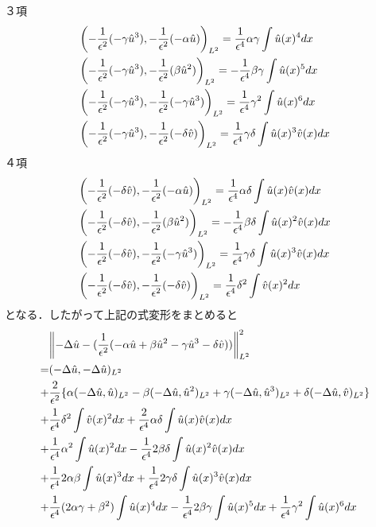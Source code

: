 ３項
\begin{align}
  &\qty(-\dfrac{1}{\epsilon^2}(-\gamma \hat{u}^3),-\dfrac{1}{\epsilon^2}(-\alpha \hat{u}))_{L^2}
  =\dfrac{1}{\epsilon^4}\alpha\gamma \int \hat{u}(x)^4 dx\\
  &\qty(-\dfrac{1}{\epsilon^2}(-\gamma \hat{u}^3),-\dfrac{1}{\epsilon^2}(\beta \hat{u}^2))_{L^2}
  =-\dfrac{1}{\epsilon^4}\beta\gamma \int \hat{u}(x)^5 dx\\
  &\qty(-\dfrac{1}{\epsilon^2}(-\gamma \hat{u}^3),-\dfrac{1}{\epsilon^2}(-\gamma \hat{u}^3))_{L^2}
  =\dfrac{1}{\epsilon^4}\gamma^2 \int \hat{u}(x)^6 dx\\
  &\qty(-\dfrac{1}{\epsilon^2}(-\gamma \hat{u}^3),-\dfrac{1}{\epsilon^2}(-\delta \hat{v}))_{L^2}
  =\dfrac{1}{\epsilon^4}\gamma\delta \int \hat{u}(x)^3\hat{v}(x) dx\\
\end{align}
４項
\begin{align}
  &\qty(-\dfrac{1}{\epsilon^2}(-\delta \hat{v}),-\dfrac{1}{\epsilon^2}(-\alpha \hat{u}))_{L^2}
  =\dfrac{1}{\epsilon^4}\alpha\delta \int \hat{u}(x)\hat{v}(x) dx\\
  &\qty(-\dfrac{1}{\epsilon^2}(-\delta \hat{v}),-\dfrac{1}{\epsilon^2}(\beta \hat{u}^2))_{L^2}
  =-\dfrac{1}{\epsilon^4}\beta\delta \int \hat{u}(x)^2\hat{v}(x) dx\\
  &\qty(-\dfrac{1}{\epsilon^2}(-\delta \hat{v}),-\dfrac{1}{\epsilon^2}(-\gamma \hat{u}^3))_{L^2}
  =\dfrac{1}{\epsilon^4}\gamma\delta \int \hat{u}(x)^3\hat{v}(x) dx\\
  &\qty(-\dfrac{1}{\epsilon^2}(-\delta \hat{v}),-\dfrac{1}{\epsilon^2}(-\delta \hat{v}))_{L^2}
  =\dfrac{1}{\epsilon^4}\delta^2 \int \hat{v}(x)^2 dx\\
\end{align}
となる．したがって上記の式変形をまとめると
\begin{align}
  &\norm{-\Delta \hat{u}-(\dfrac{1}{\epsilon^2}(-\alpha \hat{u} + \beta \hat{u}^2 -\gamma \hat{u}^3-\delta \hat{v}))}_{L^2}^2\\
  =&(-\Delta \hat{u},-\Delta \hat{u})_{L^2}\\%
  +&\dfrac{2}{\epsilon^2}\{\alpha(-\Delta \hat{u},\hat{u})_{L^2}%
  -\beta(-\Delta \hat{u}, \hat{u}^2)_{L^2}
  +\gamma(-\Delta \hat{u}, \hat{u}^3)_{L^2}
  +\delta(-\Delta \hat{u}, \hat{v})_{L^2}\}\\
  +&\dfrac{1}{\epsilon^4}\delta^2 \int \hat{v}(x)^2 dx+\dfrac{2}{\epsilon^4}\alpha\delta \int \hat{u}(x)\hat{v}(x) dx\\
  +&\dfrac{1}{\epsilon^4}\alpha^2 \int \hat{u}(x)^2 dx
  -\dfrac{1}{\epsilon^4}2\beta\delta \int \hat{u}(x)^2\hat{v}(x) dx\\
  +&\dfrac{1}{\epsilon^4}2\alpha\beta\int \hat{u}(x)^3 dx
  +\dfrac{1}{\epsilon^4}2\gamma\delta \int \hat{u}(x)^3\hat{v}(x) dx\\
  +&\dfrac{1}{\epsilon^4}(2\alpha\gamma+\beta^2) \int \hat{u}(x)^4 dx -\dfrac{1}{\epsilon^4}2\beta\gamma \int \hat{u}(x)^5 dx +\dfrac{1}{\epsilon^4}\gamma^2 \int \hat{u}(x)^6 dx\\
\end{align}
